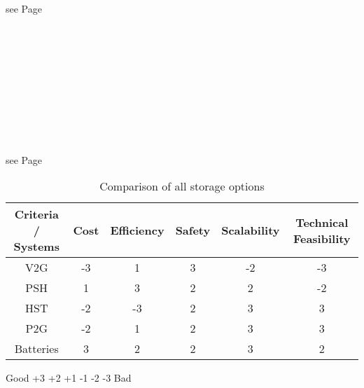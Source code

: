 \begin{parcolumns}[colwidths={1=2.5 cm, 2=10 cm, 3=2.5cm}]{3}
{\begin{tiny}
see Page \pageref{PowertoGas_Christian} \\ \\ \\ \\ \\ \\ \\ \\ \\ \\ \\
see Page \pageref{Batteries} 
\end{tiny}
}
\end{parcolumns}

\begin{table}[h]
\centering 
\caption{Comparison of all storage options}
\begin{tabular}[h]{cccccc}
\toprule
Criteria / Systems & Cost & Efficiency & Safety & Scalability & Technical Feasibility \\ 
\midrule
V2G & -3 & 1 & 3 & -2 & -3 \\
PSH & 1 & 3 & 2 & 2 & -2 \\
HST & -2 & -3 & 2 & 3 & 3 \\
P2G & -2 & 1 & 2 & 3 & 3 \\
Batteries & 3 & 2 & 2 & 3 & 2 \\
\bottomrule
\end{tabular}
\end{table}
\centerline{Good		+3	+2	+1	-1	-2	-3		  Bad}
